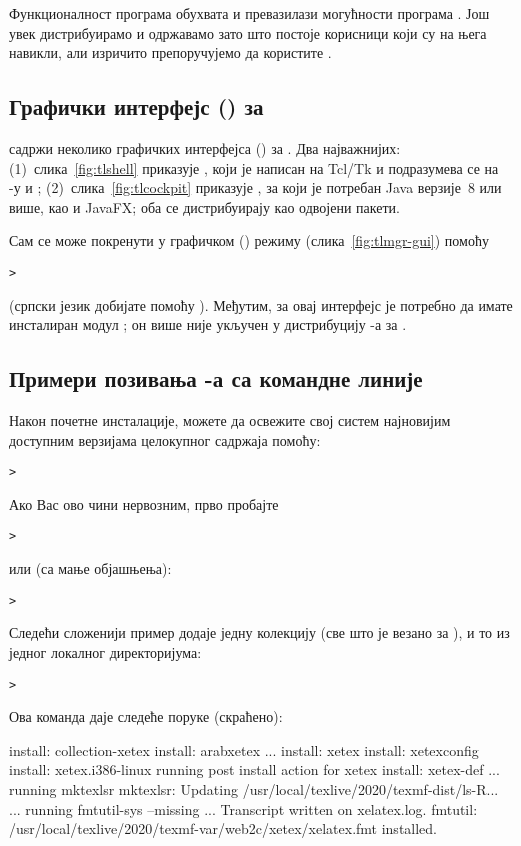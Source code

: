 \documentclass{article}
\begin{document}
Функционалност програма  обухвата и превазилази могућности
програма . Још увек дистрибуирамо и одржавамо
 зато што постоје корисници који су на њега навикли, али
изричито препоручујемо да користите .


\subsection{Графички интерфејс (\GUI{}) за }

\TL{} садржи неколико графичких интерфејса (\GUI{}) за . 
Два најважнијих: (1)~слика~\ref{fig:tlshell} приказује , 
који је написан на Tcl/Tk и подразумева се на \Windows{}-у и \MacOSX{};
(2)~слика~\ref{fig:tlcockpit} приказује , за који је 
потребан Java верзије~8 или више, као и JavaFX; оба се дистрибуирају
као одвојени пакети.

Сам  се може покренути у графичком (\GUI{}) режиму
  (слика~\ref{fig:tlmgr-gui}) помоћу
\begin{alltt}> 
\end{alltt}
(српски језик добијате помоћу ). Међутим, за овај 
интерфејс је потребно да имате инсталиран модул ; 
он више није укључен у дистрибуцију \TL{}-а за \Windows{}.


\subsection{Примери позивања -а са командне линије}

Након почетне инсталације, можете да освежите свој систем најновијим
доступним верзијама целокупног садржаја помоћу:
\begin{alltt}> 
\end{alltt}
Ако Вас ово чини нервозним, прво пробајте
\begin{alltt}> 
\end{alltt}
или (са мање објашњења):
\begin{alltt}> 
\end{alltt}

Следећи сложенији пример додаје једну колекцију (све што је везано за
\XeTeX), и то из једног локалног директоријума:

\begin{alltt}> 
\end{alltt}
Ова команда даје следеће поруке (скраћено):
\begin{fverbatim}
install: collection-xetex
install: arabxetex
...
install: xetex
install: xetexconfig
install: xetex.i386-linux
running post install action for xetex
install: xetex-def
...
running mktexlsr
mktexlsr: Updating /usr/local/texlive/2020/texmf-dist/ls-R...
...
running fmtutil-sys --missing
...
Transcript written on xelatex.log.
fmtutil: /usr/local/texlive/2020/texmf-var/web2c/xetex/xelatex.fmt installed.
\end{fverbatim}
\end{document}
